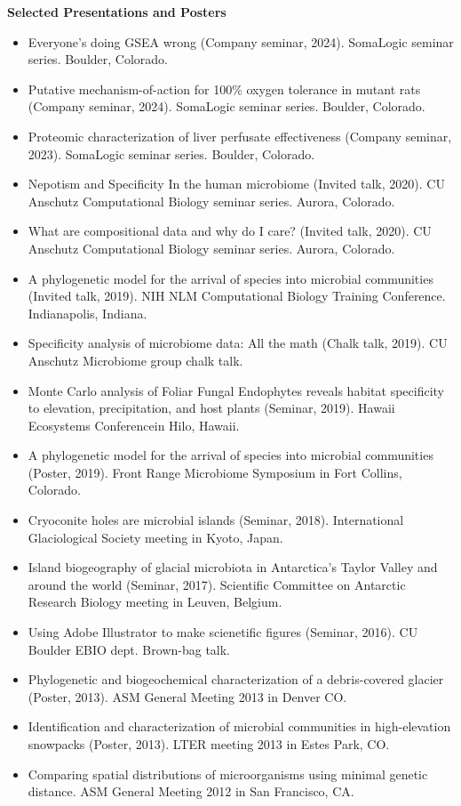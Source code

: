\documentclass{article}
\begin{document}
{\large  \textbf{Selected Presentations and Posters}}
\begin{itemize}[noitemsep,topsep=0pt, leftmargin=5mm]
  \item Everyone's doing GSEA wrong (Company seminar, 2024). SomaLogic seminar series. Boulder, Colorado.
  \item Putative mechanism-of-action for 100\% oxygen tolerance in mutant rats (Company seminar, 2024). SomaLogic seminar series. Boulder, Colorado.
  \item Proteomic characterization of liver perfusate effectiveness (Company seminar, 2023). SomaLogic seminar series. Boulder, Colorado.
  \item Nepotism and Specificity In the human microbiome (Invited talk, 2020). CU Anschutz Computational Biology seminar series. Aurora, Colorado.
  \item What are compositional data and why do I care? (Invited talk, 2020). CU Anschutz Computational Biology seminar series. Aurora, Colorado.
  \item A phylogenetic model for the arrival of species into microbial communities (Invited talk, 2019). NIH NLM Computational Biology Training Conference. Indianapolis, Indiana.
  \item Specificity analysis of microbiome data: All the math (Chalk talk, 2019). CU Anschutz Microbiome group chalk talk.
  \item Monte Carlo analysis of Foliar Fungal Endophytes reveals habitat specificity to elevation, precipitation, and host plants (Seminar, 2019). Hawaii Ecosystems Conferencein  Hilo, Hawaii.
  \item A phylogenetic model for the arrival of species into microbial communities (Poster, 2019). Front Range Microbiome Symposium in Fort Collins, Colorado.
  \item Cryoconite holes are microbial islands (Seminar, 2018). International Glaciological Society meeting in Kyoto, Japan.
  \item Island biogeography of glacial microbiota in Antarctica’s Taylor Valley and around the world (Seminar, 2017). Scientific Committee on Antarctic Research Biology meeting in Leuven, Belgium.
  \item Using Adobe Illustrator to make scienetific figures (Seminar, 2016). CU Boulder EBIO dept. Brown-bag talk.
  \item Phylogenetic and biogeochemical characterization of a debris-covered glacier (Poster, 2013). ASM General Meeting 2013 in Denver CO.
  \item Identification and characterization of microbial communities in high-elevation snowpacks (Poster, 2013). LTER meeting 2013 in Estes Park, CO.
  \item Comparing spatial distributions of microorganisms using minimal genetic distance. ASM General Meeting 2012 in San Francisco, CA.
\end{itemize}
\end{document}
